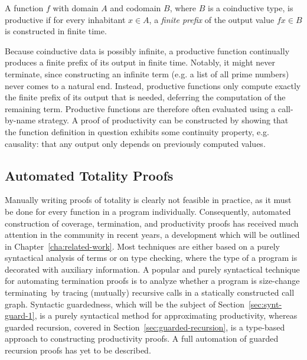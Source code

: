 \begin{definition}
\label{def:productive_function}
  A function $f$ with domain $A$ and codomain $B$, where $B$ is a coinductive
  type, is productive if for every inhabitant $x\in A$, a \emph{finite prefix}
  of the output value $f x\in B$ is constructed in finite time.
\end{definition}

Because coinductive data is possibly infinite, a productive function continually
produces a finite prefix of its output in finite time. Notably, it might never
terminate, since constructing an infinite term (e.g. a list of all prime
numbers) never comes to a natural end. Instead, productive functions only
compute exactly the finite prefix of its output that is needed, deferring the
computation of the remaining term. Productive functions are therefore often
evaluated using a call-by-name strategy. A proof of productivity can be
constructed by showing that the function definition in question exhibits some
continuity property, e.g. causality: that any output only depends on previously
computed values.

\subsection{Automated Totality Proofs}
Manually writing proofs of totality is clearly not feasible in practice, as it
must be done for every function in a program individually. Consequently,
automated construction of coverage, termination, and productivity proofs has
received much attention in the community in recent years, a development which
will be outlined in Chapter~\ref{cha:related-work}. Most techniques are either
based on a purely syntactical analysis of terms or on type checking, where the
type of a program is decorated with auxiliary information. A popular and purely
syntactical technique for automating termination proofs is to analyze whether a
program is size-change terminating\,\citep{LeeJones01SizeChange} by tracing
(mutually) recursive calls in a statically constructed call graph. Syntactic
guardedness, which will be the subject of Section~\ref{sec:synt-guard-1}, is a
purely syntactical method for approximating productivity, whereas guarded
recursion, covered in Section~\ref{sec:guarded-recursion}, is a type-based
approach to constructing productivity proofs. A full automation of guarded recursion
proofs has yet to be described.


